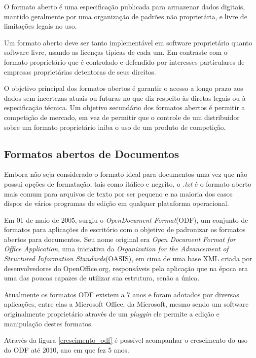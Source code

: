 O formato aberto é uma especificação publicada para armazenar dados digitais, mantido geralmente por uma organização de padrões não proprietária, e livre de limitações legais no uso.

Um formato aberto deve ser tanto implementável em software proprietário quanto software livre, usando as licenças típicas de cada um. Em contraste com o formato proprietário que é controlado e defendido por interesses particulares de empresas proprietárias detentoras de seus direitos.

O objetivo principal dos formatos abertos é garantir o acesso a longo prazo aos dados sem incertezas atuais ou futuras no que diz respeito às diretas legais ou à especificação técnica. Um objetivo secundário dos formatos abertos é permitir a competição de mercado, em vez de permitir que o controle de um distribuidor sobre um formato proprietário iniba o uso de um produto de competição.

\subsection{Formatos abertos de Documentos}
\label{documentos}

Embora não seja considerado o formato ideal para documentos uma vez que não possui opções de formatação; tais como itálico e negrito, o \textit{.txt} é o formato aberto mais comum para arquivos de texto por ser pequeno e na maioria dos casos dispor de vários programas de edição em qualquer plataforma operacional.

Em 01 de maio de 2005, surgiu o \textit{OpenDocument Format}(ODF), um conjunto de formatos para aplicações de escritório com o objetivo de padronizar os formatos abertos para documentos. Seu nome original era \textit{Open Document Format for Office Application}, uma iniciativa da \textit{Organization for the Advancement of Structured Information Standards}(OASIS), em cima de uma base XML criada por desenvolvedores do OpenOffice.org, responsáveis pela aplicação que na época era uma das poucas capazes de utilizar sua estrutura, senão a única.

Atualmente os formatos ODF existem a 7 anos e foram adotados por diversas aplicações, entre elas a Microsoft Office, da Microsoft, mesmo sendo um software originalmente proprietário através de um \textit{pluggin} ele permite a edição e manipulação destes formatos.

Através da figura \ref{crescimento_odf} é possível acompanhar o crescimento do uso do ODF até 2010, ano em que fez 5 anos.

